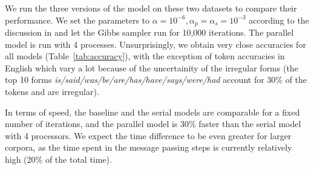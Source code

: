 We run the three versions of the model on these two datasets to compare their performance. We set the parameters to $\alpha = 10^{-6}, \alpha_p = \alpha_s = 10^{-3}$ according to the discussion in \cite{goldwater2011} and let the Gibbs sampler run for 10,000 iterations. The parallel model is run with 4 processes. Unsurprisingly, we obtain very close accuracies for all models (Table~\ref{tab:accuracy}), with the exception of token accuracies in English which vary a lot because of the uncertainity of the irregular forms (the top 10 forms \textit{is/said/was/be/are/has/have/says/were/had} account for 30\% of the tokens and are irregular).

In terms of speed, the baseline and the serial models are comparable for a fixed number of iterations, and the parallel model is 30\% faster than the serial model with 4 processors. We expect the time difference to be even greater for larger corpora, as the time spent in the message passing steps is currently relatively high (20\% of the total time).

